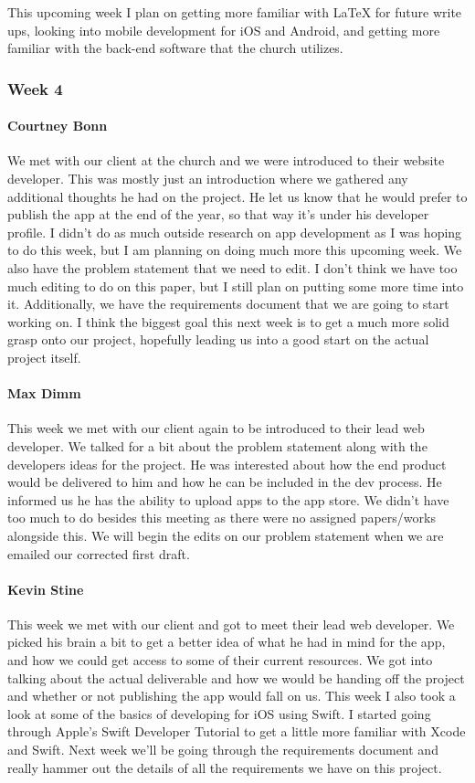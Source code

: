 This upcoming week I plan on getting more familiar with LaTeX for future write ups, looking into mobile development for iOS and Android, and getting more familiar with the back-end software that the church utilizes.

		\subsubsection{Week 4}
		
			\paragraph{Courtney Bonn}
			We met with our client at the church and we were introduced to their website developer. This was mostly just an introduction where we gathered any additional thoughts he had on the project. He let us know that he would prefer to publish the app at the end of the year, so that way it's under his developer profile. I didn't do as much outside research on app development as I was hoping to do this week, but I am planning on doing much more this upcoming week. We also have the problem statement that we need to edit. I don't think we have too much editing to do on this paper, but I still plan on putting some more time into it. Additionally, we have the requirements document that we are going to start working on. I think the biggest goal this next week is to get a much more solid grasp onto our project, hopefully leading us into a good start on the actual project itself.

			\paragraph{Max Dimm}
			This week we met with our client again to be introduced to their lead web developer. We talked for a bit about the problem statement along with the developers ideas for the project. He was interested about how the end product would be delivered to him and how he can be included in the dev process. He informed us he has the ability to upload apps to the app store. We didn't have too much to do besides this meeting as there were no assigned papers/works alongside this. We will begin the edits on our problem statement when we are emailed our corrected first draft.
			
			\paragraph{Kevin Stine}
			This week we met with our client and got to meet their lead web developer. We picked his brain a bit to get a better idea of what he had in mind for the app, and how we could get access to some of their current resources. We got into talking about the actual deliverable and how we would be handing off the project and whether or not publishing the app would fall on us. This week I also took a look at some of the basics of developing for iOS using Swift. I started going through Apple's Swift Developer Tutorial to get a little more familiar with Xcode and Swift. Next week we'll be going through the requirements document and really hammer out the details of all the requirements we have on this project.
			
